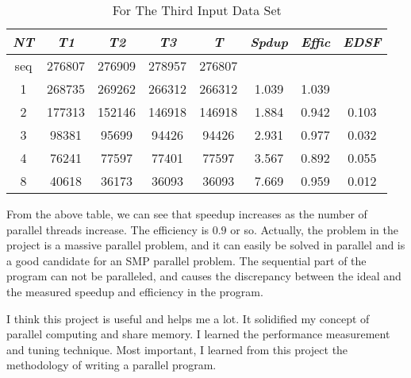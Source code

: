 \documentclass[12pt]{article}
\begin{document}

\begin{table}[htb]
\begin{center}
\begin{normalsize}
\caption{For The Third Input Data Set}
\begin {tabular} {|c|c|c|c|c|c|c|c|}
\hline 
\hline
{\em \bf NT} & {\em \bf T1} &{\em \bf T2}&{\em \bf T3}&{\em \bf T}&{\em \bf Spdup}&{\em \bf Effic}&{\em \bf EDSF}\\
\hline
seq&276807&276909&278957&276807&~&~&~\\
\hline
1&268735&269262&266312&266312&1.039&1.039&~\\
\hline
2&177313&152146&146918&146918&1.884&0.942&0.103\\
\hline
3&98381&95699&94426&94426&2.931&0.977&0.032\\
\hline
4&76241&77597&77401&77597&3.567&0.892&0.055\\
\hline
8&40618&36173&36093&36093&7.669&0.959&0.012\\
\hline
\end {tabular}
\end{normalsize}
\end{center}
\end {table}
From the above table, we can see that speedup increases as the number of parallel threads increase. The efficiency is $0.9$ or so. Actually, the problem in the project is a massive parallel problem, and it can easily be solved in parallel and is a good candidate for an SMP parallel problem. The sequential part of the program can not be paralleled, and causes the discrepancy between the ideal and the measured speedup and efficiency in the program.    

I think this project is useful and helps me a lot. It solidified my concept of parallel computing and share memory. I learned the performance measurement and tuning technique. Most important, I learned from this project the methodology of writing a parallel program. 
\end{document}
